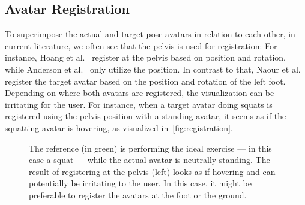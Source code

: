 \subsection{Avatar Registration \label{sec:register}}
To superimpose the actual and target pose avatars in relation to each other, in current literature, we often see that the pelvis is used for registration:  For instance, Hoang et al.~\cite{hoang2016onebody} register at the pelvis based on position and rotation, while Anderson et al.~\cite{anderson2013youmove} only utilize the position. In contrast to that, Naour et al.~\cite{naour2019superimpose} register the target avatar based on the position and rotation of the left foot. Depending on where both avatars are registered, the visualization can be irritating for the user. For instance, when a target avatar doing squats is registered using the pelvis position with a standing avatar, it seems as if the squatting avatar is hovering, as visualized in~\autoref{fig:registration}.
\begin{figure}[h!]
	\centering    {}
	\caption{The reference (in green) is performing the ideal exercise --- in this case a squat --- while the actual avatar is neutrally standing. The result of registering at the pelvis (left) looks as if hovering and can potentially be irritating to the user. In this case, it might be preferable to register the avatars at the foot or the ground. \label{fig:registration}}
\end{figure}



